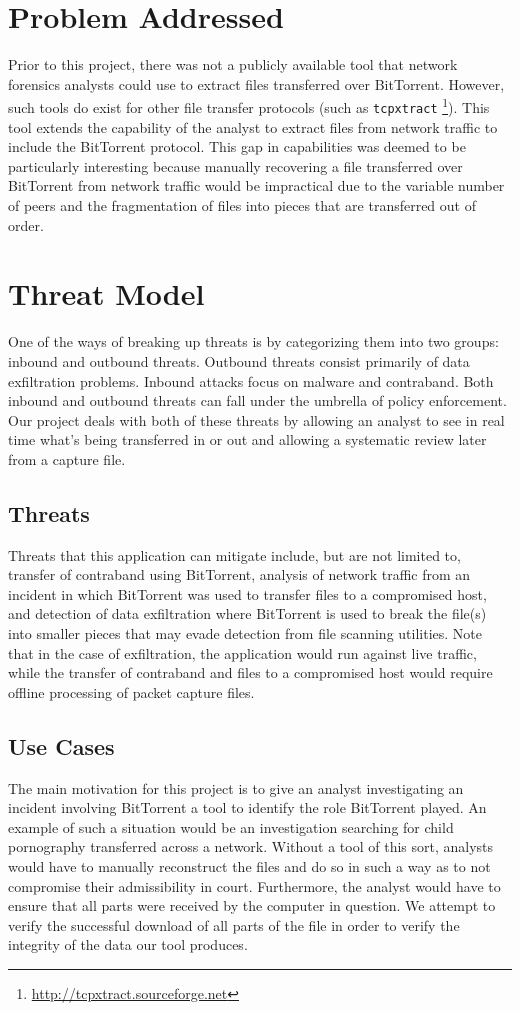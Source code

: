 \documentclass{acm_proc_article-sp}
\begin{document}
\section{Problem Addressed}
Prior to this project, there was not a publicly available tool that network
forensics analysts could use to extract files transferred over BitTorrent.
However, such tools do exist for other file transfer protocols (such as
\texttt{tcpxtract} \footnote{\url{http://tcpxtract.sourceforge.net}}). This
tool extends the capability of the analyst to extract files from network
traffic to include the BitTorrent protocol. This gap in capabilities was deemed
to be particularly interesting because manually recovering a file transferred
over BitTorrent from network traffic would be impractical due to the variable
number of peers and the fragmentation of files into pieces that are transferred
out of order.

\section{Threat Model}
One of the ways of breaking up threats is by categorizing them into two groups:
inbound and outbound threats.  Outbound threats consist primarily of data
exfiltration problems.  Inbound attacks focus on malware and contraband. Both
inbound and outbound threats can fall under the umbrella of policy enforcement.
Our project deals with both of these threats by allowing an analyst to see in
real time what's being transferred in or out and allowing a systematic review
later from a capture file.

\subsection{Threats}
Threats that this application can mitigate include, but are not limited to,
transfer of contraband using BitTorrent, analysis of network traffic from an
incident in which BitTorrent was used to transfer files to a compromised host,
and detection of data exfiltration where BitTorrent is used to break the
file(s) into smaller pieces that may evade detection from file scanning
utilities. Note that in the case of exfiltration, the application would run
against live traffic, while the transfer of contraband and files to a
compromised host would require offline processing of packet capture files.

\subsection{Use Cases}
The main motivation for this project is to give an analyst investigating an
incident involving BitTorrent a tool to identify the role BitTorrent played.  An
example of such a situation would be an investigation searching for child
pornography transferred across a network. Without a tool of this sort, analysts
would have to manually reconstruct the files and do so in such a way as to not
compromise their admissibility in court. Furthermore, the analyst would have to
ensure that all parts were received by the computer in question. We attempt to
verify the successful download of all parts of the file in order to verify the
integrity of the data our tool produces.
\end{document}
